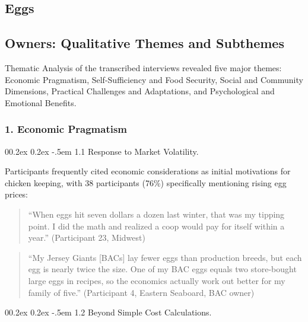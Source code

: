 \documentclass[
  man,
  floatsintext,
  longtable,
  nolmodern,
  notxfonts,
  notimes,
  colorlinks=true,linkcolor=blue,citecolor=blue,urlcolor=blue]{apa7}
\makeatletter
\renewcommand{\paragraph}{\@startsection{paragraph}{4}{\parindent}%
	{0\baselineskip \@plus 0.2ex \@minus 0.2ex}%
	{-.5em}%
	{\normalfont\normalsize\bfseries\typesectitle}}
\makeatother
\begin{document}
\subsection{Eggs}\label{eggs}

\subsection{Owners: Qualitative Themes and
Subthemes}\label{owners-qualitative-themes-and-subthemes}

Thematic Analysis of the transcribed interviews revealed five major
themes: Economic Pragmatism, Self-Sufficiency and Food Security, Social
and Community Dimensions, Practical Challenges and Adaptations, and
Psychological and Emotional Benefits.

\subsubsection{1. Economic Pragmatism}\label{economic-pragmatism}

\paragraph{1.1 Response to Market
Volatility.}\label{response-to-market-volatility}

Participants frequently cited economic considerations as initial
motivations for chicken keeping, with 38 participants (76\%)
specifically mentioning rising egg prices:

\begin{quote}
``When eggs hit seven dollars a dozen last winter, that was my tipping
point. I did the math and realized a coop would pay for itself within a
year.'' (Participant 23, Midwest)
\end{quote}

\begin{quote}
``My Jersey Giants {[}BACs{]} lay fewer eggs than production breeds, but
each egg is nearly twice the size. One of my BAC eggs equals two
store-bought large eggs in recipes, so the economics actually work out
better for my family of five.'' (Participant 4, Eastern Seaboard, BAC
owner)
\end{quote}

\paragraph{1.2 Beyond Simple Cost
Calculations.}\label{beyond-simple-cost-calculations}
\end{document}
